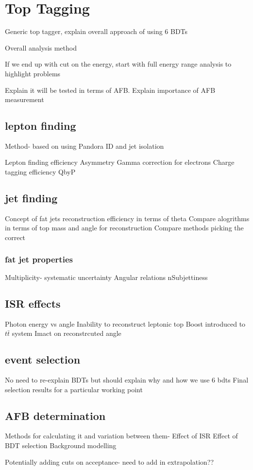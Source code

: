 \chapter{Top Tagging}

Generic top tagger, explain overall approach of using 6 BDTs

Overall analysis method

If we end up with cut on the energy, start with full energy range analysis to highlight problems

Explain it will be tested in terms of AFB. 
Explain importance of AFB measurement

\section{lepton finding}
Method- based on using Pandora ID and jet isolation

Lepton finding efficiency
Asymmetry
Gamma correction for electrons
Charge tagging efficiency
QbyP

\section{jet finding}
Concept of fat jets
reconstruction efficiency in terms of theta
Compare alogrithms in terms of top mass and angle for reconstruction
Compare methods picking the correct 

\subsection{fat jet properties}
Multiplicity- systematic uncertainty
Angular relations
nSubjettiness

\section{ISR effects}
Photon energy vs angle
Inability to reconstruct leptonic top
Boost introduced to $t\bar{t}$ system
Imact on reconstrcuted angle

\section{event selection}
No need to re-explain BDTs but should explain why and how we use 6 bdts
Final selection results for a particular working point

\section{AFB determination}

Methods for calculating it and variation between them-
Effect of ISR
Effect of BDT selection
Background modelling

Potentially adding cuts on acceptance- need to add in extrapolation??
